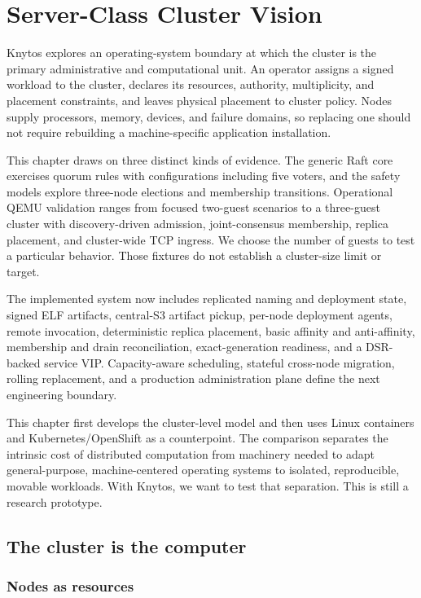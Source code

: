 \chapter{Server-Class Cluster Vision}
\label{chap:cluster-vision}

Knytos explores an operating-system boundary at which the cluster is the
primary administrative and computational unit. An operator assigns a signed
workload to the cluster, declares its resources, authority, multiplicity, and
placement constraints, and leaves physical placement to cluster policy. Nodes
supply processors, memory, devices, and failure domains, so replacing one should
not require rebuilding a machine-specific application installation.

This chapter draws on three distinct kinds of evidence.
The generic Raft core exercises quorum rules with configurations including
five voters, and the safety models explore three-node elections and membership
transitions. Operational QEMU validation ranges from focused two-guest
scenarios to a three-guest cluster with discovery-driven admission,
joint-consensus membership, replica placement, and cluster-wide TCP ingress.
We choose the number of guests to test a particular behavior. Those fixtures
do not establish a cluster-size limit or target.

The implemented system now includes replicated naming and deployment state,
signed ELF artifacts, central-S3 artifact pickup, per-node deployment agents,
remote invocation, deterministic replica placement, basic affinity and
anti-affinity, membership and drain reconciliation, exact-generation
readiness, and a DSR-backed service VIP. Capacity-aware scheduling, stateful
cross-node migration, rolling replacement, and a production administration
plane define the next engineering boundary.

This chapter first develops the cluster-level model and then uses Linux
containers and Kubernetes/OpenShift as a counterpoint. The comparison separates
the intrinsic cost of distributed computation from machinery needed to adapt
general-purpose, machine-centered operating systems to isolated, reproducible,
movable workloads. With Knytos, we want to test that separation.
This is still a research prototype.

\section{The cluster is the computer}

\subsection{Nodes as resources}

